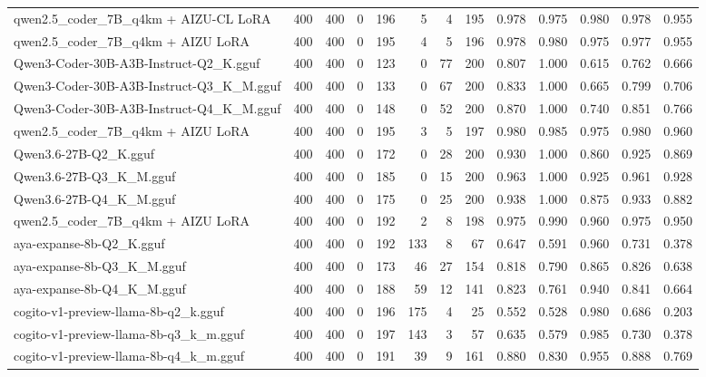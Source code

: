 \begin{table}[htbp]
{\begin{tabular}{lrrrrrrrrrrrr}
    qwen2.5\_coder\_7B\_q4km + AIZU-CL LoRA & 400 & 400 & 0 & 196 & 5 & 4 & 195 & 0.978 & 0.975 & 0.980 & 0.978 & \cellcolor{green!40}0.955 \\
    qwen2.5\_coder\_7B\_q4km + AIZU LoRA & 400 & 400 & 0 & 195 & 4 & 5 & 196 & 0.978 & 0.980 & 0.975 & 0.977 & \cellcolor{green!30}0.955 \\
    Qwen3-Coder-30B-A3B-Instruct-Q2\_K.gguf & 400 & 400 & 0 & 123 & 0 & 77 & 200 & 0.807 & 1.000 & 0.615 & 0.762 & 0.666 \\
    Qwen3-Coder-30B-A3B-Instruct-Q3\_K\_M.gguf & 400 & 400 & 0 & 133 & 0 & 67 & 200 & 0.833 & 1.000 & 0.665 & 0.799 & 0.706 \\
    Qwen3-Coder-30B-A3B-Instruct-Q4\_K\_M.gguf & 400 & 400 & 0 & 148 & 0 & 52 & 200 & 0.870 & 1.000 & 0.740 & 0.851 & 0.766 \\
    qwen2.5\_coder\_7B\_q4km + AIZU LoRA & 400 & 400 & 0 & 195 & 3 & 5 & 197 & 0.980 & 0.985 & 0.975 & 0.980 & \cellcolor{green!50}0.960 \\
    Qwen3.6-27B-Q2\_K.gguf & 400 & 400 & 0 & 172 & 0 & 28 & 200 & 0.930 & 1.000 & 0.860 & 0.925 & 0.869 \\
    Qwen3.6-27B-Q3\_K\_M.gguf & 400 & 400 & 0 & 185 & 0 & 15 & 200 & 0.963 & 1.000 & 0.925 & 0.961 & \cellcolor{green!10}0.928 \\
    Qwen3.6-27B-Q4\_K\_M.gguf & 400 & 400 & 0 & 175 & 0 & 25 & 200 & 0.938 & 1.000 & 0.875 & 0.933 & 0.882 \\
    qwen2.5\_coder\_7B\_q4km + AIZU LoRA & 400 & 400 & 0 & 192 & 2 & 8 & 198 & 0.975 & 0.990 & 0.960 & 0.975 & \cellcolor{green!20}0.950 \\
    aya-expanse-8b-Q2\_K.gguf & 400 & 400 & 0 & 192 & 133 & 8 & 67 & 0.647 & 0.591 & 0.960 & 0.731 & 0.378 \\
    aya-expanse-8b-Q3\_K\_M.gguf & 400 & 400 & 0 & 173 & 46 & 27 & 154 & 0.818 & 0.790 & 0.865 & 0.826 & 0.638 \\
    aya-expanse-8b-Q4\_K\_M.gguf & 400 & 400 & 0 & 188 & 59 & 12 & 141 & 0.823 & 0.761 & 0.940 & 0.841 & 0.664 \\
    cogito-v1-preview-llama-8b-q2\_k.gguf & 400 & 400 & 0 & 196 & 175 & 4 & 25 & 0.552 & 0.528 & 0.980 & 0.686 & 0.203 \\
    cogito-v1-preview-llama-8b-q3\_k\_m.gguf & 400 & 400 & 0 & 197 & 143 & 3 & 57 & 0.635 & 0.579 & 0.985 & 0.730 & 0.378 \\
    cogito-v1-preview-llama-8b-q4\_k\_m.gguf & 400 & 400 & 0 & 191 & 39 & 9 & 161 & 0.880 & 0.830 & 0.955 & 0.888 & 0.769 \\

\end{tabular}}
\end{table}
